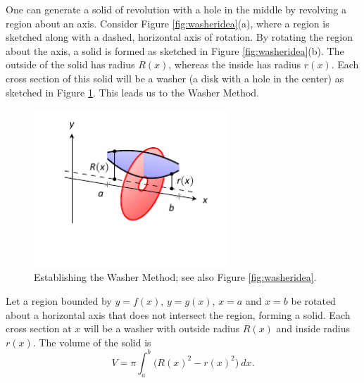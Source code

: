 One can generate a solid of revolution with a hole in the middle by revolving a region about an axis. Consider Figure \ref{fig:washeridea}(a), where a region is sketched along with a dashed, horizontal axis of rotation. By rotating the region about the axis, a solid is formed as sketched in Figure \ref{fig:washeridea}(b). The outside of the solid has radius $R(x)$, whereas the inside has radius $r(x)$. Each cross section of this solid will be a washer (a disk with a hole in the center) as sketched in Figure \ref{fig:washeridea_b}.	This leads us to the Washer Method.


\begin{figure}[H]
\centering
\includegraphics[width=0.65\textwidth]{figures/figwasher_idea_c}
\caption{Establishing the Washer Method; see also Figure \ref{fig:washeridea}.}
\label{fig:washeridea_b}
\end{figure}



\begin{formulabox}
{Let a region bounded by $y=f(x)$, $y=g(x)$, $x=a$ and $x=b$ be rotated about a horizontal axis that does not intersect the region, forming a solid. Each cross section at $x$ will be a washer with outside radius $R(x)$ and inside radius $r(x)$. The volume of the solid is
$$V = \pi\int_a^b \Big(R(x)^2-r(x)^2\Big)\ dx.$$ 
}
\end{formulabox}



